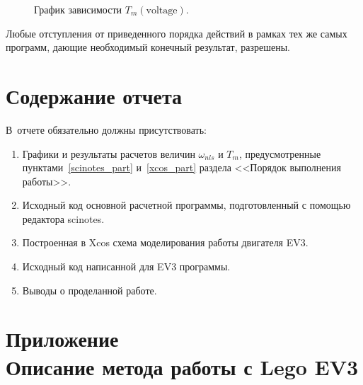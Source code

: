 \documentclass[12pt,a4paper,openany]{extarticle}
\begin{document}
\begin{enumerate}
\begin{figure}[h!]
	\label{omega_nls_power}
\end{figure}
\begin{figure}[h!]
	\noindent{}
	\caption{График зависимости $T_m(\mathrm{voltage})$.}
	\label{Tm_power}
\end{figure}
\end{enumerate}

Любые отступления от приведенного порядка действий в рамках тех же самых программ, дающие необходимый конечный результат, разрешены.
 
\newpage 
\section{Содержание отчета}
\hspace*{\parindent}В~отчете обязательно должны присутствовать:
\begin{enumerate}
\item Графики и результаты расчетов величин $\omega_{nls}$ и $T_m$, предусмотренные пунктами~\ref{scinotes_part} и~\ref{xcos_part} раздела <<Порядок выполнения работы>>.
\item Исходный код основной расчетной программы, подготовленный с помощью редактора scinotes.
\item Построенная в Xcos схема моделирования работы двигателя EV3.
\item Исходный код написанной для EV3 программы.
\item Выводы о проделанной работе.
\end{enumerate}
\section{Приложение \\Описание метода работы с Lego EV3} \label{addition}
\end{document}
